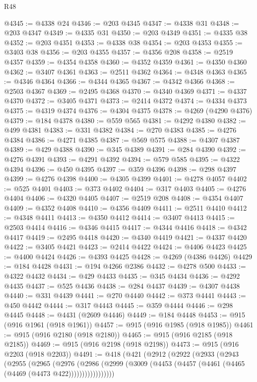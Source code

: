 \begin{lexlean}{R48}
\begin{coremodule}
@4345 := @4338 @24
@4346 := @203 @4345
@4347 := @4338 @31
@4348 := @203 @4347
@4349 := @4335 @31
@4350 := @203 @4349
@4351 := @4335 @38
@4352 := @203 @4351
@4353 := @4338 @38
@4354 := @203 @4353
@4355 := @3403 @38
@4356 := @203 @4355
@4357 := @4356 @208
@4358 := @2519 @4357
@4359 := @4354 @4358
@4360 := @4352 @4359
@4361 := @4350 @4360
@4362 := @3407 @4361
@4363 := @2511 @4362
@4364 := @4348 @4363
@4365 := @4346 @4364
@4366 := @4344 @4365
@4367 := @4342 @4366
@4368 := @2503 @4367
@4369 := @2495 @4368
@4370 := @4340 @4369
@4371 := @4337 @4370
@4372 := @3405 @4371
@4373 := @2414 @4372
@4374 := @4334 @4373
@4375 := @4319 @4374
@4376 := @4304 @4375
@4378 := @4269 (@4290 @4376)
@4379 := @184 @4378
@4380 := @559 @565
@4381 := @4292 @4380
@4382 := @499 @4381
@4383 := @331 @4382
@4384 := @270 @4383
@4385 := @4276 @4384
@4386 := @4271 @4385
@4387 := @569 @575
@4388 := @4307 @4387
@4389 := @429 @4388
@4390 := @345 @4389
@4391 := @284 @4390
@4392 := @4276 @4391
@4393 := @4291 @4392
@4394 := @579 @585
@4395 := @4322 @4394
@4396 := @450 @4395
@4397 := @359 @4396
@4398 := @298 @4397
@4399 := @4276 @4398
@4400 := @4305 @4399
@4401 := @4278 @4057
@4402 := @525 @4401
@4403 := @373 @4402
@4404 := @317 @4403
@4405 := @4276 @4404
@4406 := @4320 @4405
@4407 := @2519 @208
@4408 := @4354 @4407
@4409 := @4352 @4408
@4410 := @4356 @4409
@4411 := @2511 @4410
@4412 := @4348 @4411
@4413 := @4350 @4412
@4414 := @3407 @4413
@4415 := @2503 @4414
@4416 := @4346 @4415
@4417 := @4344 @4416
@4418 := @4342 @4417
@4419 := @2495 @4418
@4420 := @4340 @4419
@4421 := @4337 @4420
@4422 := @3405 @4421
@4423 := @2414 @4422
@4424 := @4406 @4423
@4425 := @4400 @4424
@4426 := @4393 @4425
@4428 := @4269 (@4386 @4426)
@4429 := @184 @4428
@4431 := @194 @4266 @2386
@4432 := @4278 @500
@4433 := @4322 @4432
@4434 := @429 @4433
@4435 := @345 @4434
@4436 := @4292 @4435
@4437 := @525 @4436
@4438 := @284 @4437
@4439 := @4307 @4438
@4440 := @331 @4439
@4441 := @270 @4440
@4442 := @373 @4441
@4443 := @450 @4442
@4444 := @317 @4443
@4445 := @359 @4444
@4446 := @298 @4445
@4448 := @4431 (@2609 @4446)
@4449 := @184 @4448
@4453 := @915 (@916 @1961 (@918 @1961))
@4457 := @915 (@916 @1985 (@918 @1985))
@4461 := @915 (@916 @2180 (@918 @2180))
@4465 := @915 (@916 @2185 (@918 @2185))
@4469 := @915 (@916 @2198 (@918 @2198))
@4473 := @915 (@916 @2203 (@918 @2203))
@4491 := @418
    (@421
      (@2912
        (@2922
          (@2933
            (@2943
              (@2955
                (@2965
                  (@2976
                    (@2986
                      (@2999 (@3009 (@4453 (@4457 (@4461 (@4465 (@4469 (@4473 @422)))))))))))))))))

\end{coremodule}
\end{lexlean}
